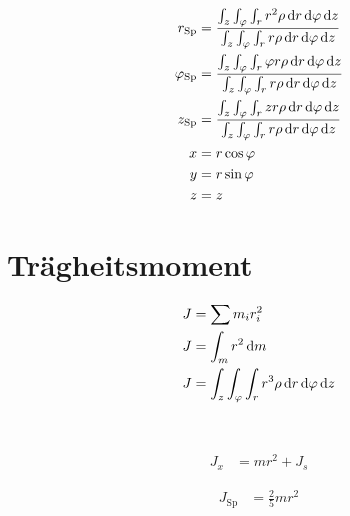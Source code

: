 \begin{boxleft}
\end{boxleft}\begin{boxrightshaded}
\begin{align}
r_{\text{Sp}}&=\frac{\int_z\int_\varphi\int_r r^2\rho \diff r \diff \varphi \diff z }{\int_z\int_\varphi\int_r r\rho \diff r \diff \varphi \diff z }\\
\varphi_{\text{Sp}}&=\frac{\int_z\int_\varphi\int_r \varphi r\rho \diff r \diff \varphi \diff z }{\int_z\int_\varphi\int_r r\rho \diff r \diff \varphi \diff z }\\
z_{\text{Sp}}&=\frac{\int_z\int_\varphi\int_r z r\rho \diff r \diff \varphi \diff z }{\int_z\int_\varphi\int_r r\rho \diff r \diff \varphi \diff z }\\
x&=r\cos{\varphi}\\
y&=r\sin{\varphi}\\
z&=z
\end{align}
\end{boxrightshaded}

\section{Trägheitsmoment}


\begin{boxleft}
\end{boxleft}\begin{boxrightshaded}
\begin{align}
J&=\sum m_i r_i^2\\
J&=\int_m r^2 \mathop{}\!\mathrm{d} m \\
J&=\int_z\int_\varphi\int_r r^3\rho \mathop{}\!\mathrm{d} r \mathop{}\!\mathrm{d} \varphi \mathop{}\!\mathrm{d} z 
\end{align}
\end{boxrightshaded}

\begin{boxleft}
\\
\end{boxleft}\begin{boxrightshaded}
\begin{align}
J_x&=mr^2+J_s
\end{align}
\end{boxrightshaded}

\begin{boxleft}
\end{boxleft}\begin{boxrightshaded}
\begin{align}
J_\text{Sp}&=\frac{2}{5}mr^2
\end{align}
\end{boxrightshaded}

